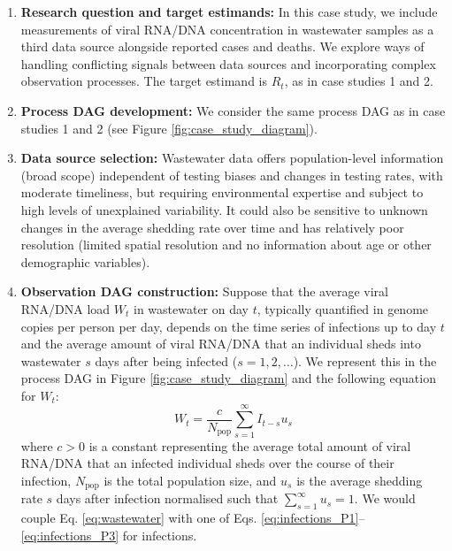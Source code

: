 \documentclass{article}
\begin{document}
\begin{enumerate}
   \item \textbf{Research question and target estimands:} In this case study, we include measurements of viral RNA/DNA concentration in wastewater samples as a third data source alongside reported cases and deaths. We explore ways of handling conflicting signals between data sources and incorporating complex observation processes. The target estimand is $R_t$, as in case studies 1 and 2.
   
    \item \textbf{Process DAG development:} We consider the same process DAG as in case studies 1 and 2 (see Figure \ref{fig:case_study_diagram}).

    \item \textbf{Data source selection:} Wastewater data offers population-level information (broad scope) independent of testing biases and changes in testing rates, with moderate timeliness, but requiring environmental expertise and subject to high levels of unexplained variability. It could also be sensitive to unknown changes in the average shedding rate over time and has relatively poor resolution (limited spatial resolution and no information about age or other demographic variables). 

    
    \item \textbf{Observation DAG construction:} 
    Suppose that the average viral RNA/DNA load $W_t$ in wastewater on day $t$, typically quantified in genome copies per person per day, depends on the time series of infections up to day $t$ and the average amount of viral RNA/DNA that an individual sheds into wastewater $s$ days after being infected ($s=1,2,\ldots$). We represent this in the process DAG in Figure \ref{fig:case_study_diagram} and the following equation for $W_t$:
    \begin{equation} \label{eq:wastewater}
        W_t = \frac{c}{N_\mathrm{pop}}\sum_{s=1}^\infty I_{t-s}u_s 
    \end{equation}
    where $c>0$ is a constant representing the average total amount of viral RNA/DNA that an infected individual sheds over the course of their infection, $N_\mathrm{pop}$ is the total population size, and $u_s$ is the average shedding rate $s$ days after infection normalised such that $\sum_{s=1}^\infty u_s=1$. We would couple Eq. \eqref{eq:wastewater} with one of Eqs. \eqref{eq:infections_P1}--\eqref{eq:infections_P3} for infections.
    

\end{enumerate}
\end{document}
